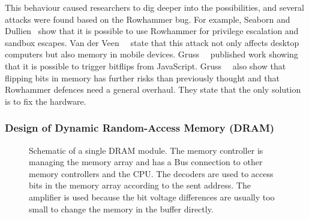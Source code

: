 This behaviour caused researchers to dig deeper into the possibilities, and
several attacks were found based on the Rowhammer bug. For example, Seaborn and
Dullien~\cite{projectzerorow} show that it is possible to use Rowhammer for
privilege escalation and sandbox escapes. Van der Veen~\etal~\cite{drammer}
state that this attack not only affects desktop computers but also memory in
mobile devices. Gruss~\etal~\cite{rowhammerjs} published work showing that it is
possible to trigger bitflips from JavaScript. Gruss~\etal~\cite{flipinthewall}
also show that flipping bits in memory has further risks than previously thought
and that Rowhammer defences need a general overhaul. They state that the only
solution is to fix the hardware.

\subsubsection{Design of Dynamic Random-Access Memory (DRAM)}

\begin{figure}[!htb]
  \centering
  \caption{Schematic of a single DRAM module. The memory controller is managing
the memory array and has a Bus connection to other memory controllers and the
CPU. The decoders are used to access bits in the memory array according to the
sent address. The amplifier is used because the bit voltage differences are
usually too small to change the memory in the buffer directly.}
  \label{fig:DRAMscheme}
\end{figure}

